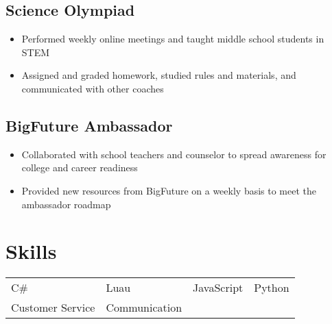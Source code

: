 \documentclass{my_cv} %
\begin{document}
\subsection{Science Olympiad}
\begin{itemize}
    \item Performed weekly online meetings and taught middle school students in STEM
    \item Assigned and graded homework, studied rules and materials, and communicated with other coaches
\end{itemize}

\subsection{BigFuture Ambassador}
\begin{itemize}
    \item Collaborated with school teachers and counselor to spread awareness for college and career readiness
    \item Provided new resources from BigFuture on a weekly basis to meet the ambassador roadmap
\end{itemize}

\section{Skills}

\begin{tabular}{l l l l}
C\# & Luau & JavaScript & Python \\
Customer Service & Communication
\end{tabular}
\end{document}
